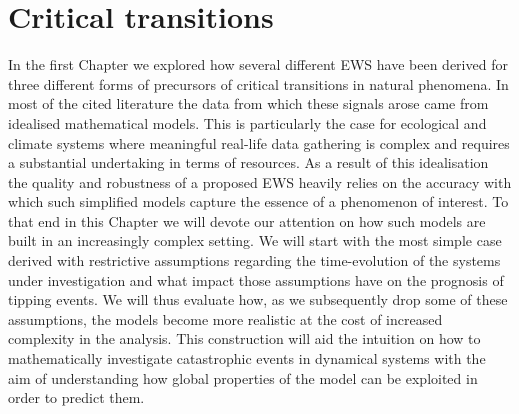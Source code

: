 \documentclass[../main.tex]{subfiles}
\begin{document}
\section{Critical transitions}\label{sec3}
In the first Chapter we explored how several different EWS have been derived for three different forms of precursors of critical transitions in natural phenomena.
In most of the cited literature the data from which these signals arose came from idealised mathematical models.
This is particularly the case for ecological and climate systems where meaningful real-life data gathering is complex and requires a substantial undertaking in terms of resources.
As a result of this idealisation the quality and robustness of a proposed EWS heavily relies on the accuracy with which such simplified models capture the essence of a phenomenon of interest.
To that end in this Chapter we will devote our attention on how such models are built in an increasingly complex setting.
We will start with the most simple case derived with restrictive assumptions regarding the time-evolution of the systems under investigation and what impact those assumptions have on the prognosis of tipping events.
We will thus evaluate how, as we subsequently drop some of these assumptions, the models become more realistic at the cost of increased complexity in the analysis.
This construction will aid the intuition on how to mathematically investigate catastrophic events in dynamical systems with the aim of understanding how global properties of the model can be exploited in order to predict them.
\end{document}
